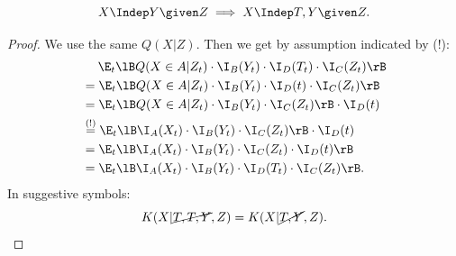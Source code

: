 \begin{Lem}
    \[X \Indep  Y \given Z \implies X \Indep  T, Y \given Z.\]

\begin{proof}
    We use the same $Q(X|Z)$. Then we get by assumption indicated by (!):
    \begin{align*}                  
      & \quad\; \E_t\lB Q( X \in A| Z_t) \cdot\I_B(Y_t)  \cdot \I_D(T_t) \cdot \I_C(Z_t)\rB \\
      & = \E_t\lB Q( X \in A| Z_t) \cdot\I_B(Y_t)  \cdot \I_D(t) \cdot \I_C(Z_t)\rB  \\
      & = \E_t\lB Q( X \in A| Z_t) \cdot\I_B(Y_t) \cdot \I_C(Z_t) \rB \cdot \I_D(t)  \\
      & \stackrel{(!)}{=}  \E_t\lB \I_A(X_t) \cdot\I_B(Y_t) \cdot \I_C(Z_t) \rB \cdot \I_D(t) \\
      & = \E_t\lB \I_A(X_t) \cdot\I_B(Y_t) \cdot \I_C(Z_t) \cdot \I_D(t)\rB \\
      & =  \E_t\lB \I_A(X_t) \cdot\I_B(Y_t) \cdot \I_D(T_t) \cdot \I_C(Z_t)\rB.
    \end{align*}
In suggestive symbols:
\[ K(X|\cancel{T,T,Y},Z) = K(X|\cancel{T,Y},Z).  \]
\end{proof}
\end{Lem}

